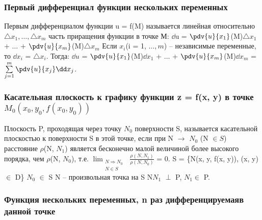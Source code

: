 \documentclass[a4paper, 12pt]{article}
\def\newline{}%
\begin{document}
            \subsubsection{Первый дифференциал функции нескольких переменных}

            Первым дифференциалом функции u = f(M) называется линейная относительно\newline
            $\triangle x_1, \ldots, \triangle x_m$ часть приращения функции в точке М:\newline
            $\dd$u = $\pdv{u}{x_1}$(M)$\triangle x_1$ + $\ldots$ + $\pdv{u}{x_m}$(M)$\triangle x_m$\newline
            Если $x_i$(i = 1, $\ldots, m$) -- независимые переменные, то $\dd x_i$ =
            $\triangle x_i$. Тогда:\newline
            $\dd u$ = $\pdv{u}{x_1}$(M)$\dd x_1$ + $\ldots$ + $\pdv{u}{x_m}$(M)$\dd x_m$ = 
            $\sum\limits_{j = 1}^{m} \pdv{u}{x_j} \dd x_j$.

            \subsubsection{Касательная плоскость к графику функции z = f(x, y) в точке\newline \texorpdfstring{$M_0(x_0, y_0, f(x_0, y_0))$}{Lg}}

            Плоскость P, проходящая через точку $N_0$ поверхности S, называется
            касательной плоскостью к поверхности S в этой точке, если при N
            $\rightarrow$ $N_0$ (N $\in S$) расстояние $\rho$(N, $N_1$) является
            бесконечно малой величиной более высокого порядка, чем $\rho$(N, $N_0$),
            т.е. $\displaystyle{\lim_{\substack{N \Rightarrow N_0\\N\in S}}}$ 
            $\frac{\rho(N, N_1)}{\rho(N, N_0)}$ = 0.\newline
            S = \{N(x, y, f(x, y)), (x, y) $\in$ D\}\newline
            $N_0$ $\in$ S\newline
            N -- произвольная точка на S\newline
            N$N_1$ $\perp$ P, $N_1 \in$ P.

            \subsubsection{Функция нескольких переменных, n раз дифференцируемая\newline в данной точке}
\end{document}
